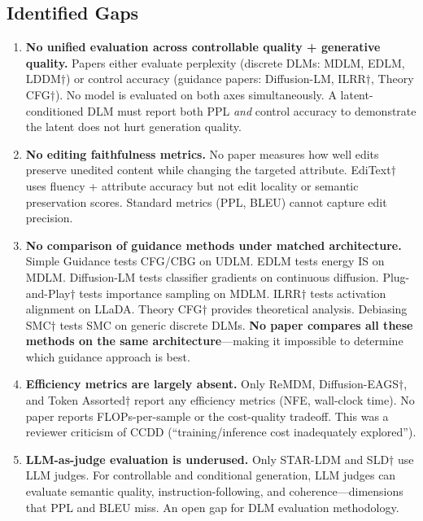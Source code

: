 \documentclass{article}
\begin{document}
\subsection{Identified Gaps}

\begin{enumerate}[label=\textbf{E\arabic*.}, leftmargin=2em]
    \item \textbf{No unified evaluation across controllable quality + generative quality.}
    Papers either evaluate perplexity (discrete DLMs: MDLM, EDLM, LDDM$\dagger$) or control accuracy (guidance papers: Diffusion-LM, ILRR$\dagger$, Theory CFG$\dagger$). No model is evaluated on both axes simultaneously. A latent-conditioned DLM must report both PPL \emph{and} control accuracy to demonstrate the latent does not hurt generation quality.

    \item \textbf{No editing faithfulness metrics.}
    No paper measures how well edits preserve unedited content while changing the targeted attribute. EdiText$\dagger$ uses fluency + attribute accuracy but not edit locality or semantic preservation scores. Standard metrics (PPL, BLEU) cannot capture edit precision.

    \item \textbf{No comparison of guidance methods under matched architecture.}
    Simple Guidance tests CFG/CBG on UDLM. EDLM tests energy IS on MDLM. Diffusion-LM tests classifier gradients on continuous diffusion. Plug-and-Play$\dagger$ tests importance sampling on MDLM. ILRR$\dagger$ tests activation alignment on LLaDA. Theory CFG$\dagger$ provides theoretical analysis. Debiasing SMC$\dagger$ tests SMC on generic discrete DLMs. \textbf{No paper compares all these methods on the same architecture}---making it impossible to determine which guidance approach is best.

    \item \textbf{Efficiency metrics are largely absent.}
    Only ReMDM, Diffusion-EAGS$\dagger$, and Token Assorted$\dagger$ report any efficiency metrics (NFE, wall-clock time). No paper reports FLOPs-per-sample or the cost-quality tradeoff. This was a reviewer criticism of CCDD (``training/inference cost inadequately explored'').

    \item \textbf{LLM-as-judge evaluation is underused.}
    Only STAR-LDM and SLD$\dagger$ use LLM judges. For controllable and conditional generation, LLM judges can evaluate semantic quality, instruction-following, and coherence---dimensions that PPL and BLEU miss. An open gap for DLM evaluation methodology.
\end{enumerate}
\end{document}
